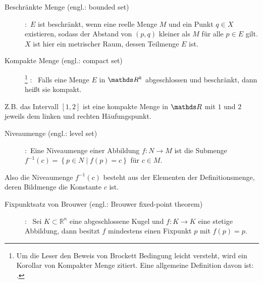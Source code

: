 \begin{Def}
	\begin{description}
		\item[Beschränkte Menge (engl.: bounded set)]
		\cite[S. 36]{rudin2009analysis}:~$E$ ist beschränkt, wenn eine reelle Menge $M$ und ein Punkt $q\in X$ existieren, sodass der Abstand von $(p,q)$ kleiner als $M$ für alle $p\in E$ gilt. $X$ ist hier ein metrischer Raum, dessen Teilmenge $E$ ist.
	\end{description}
\end{Def}
\begin{Def}
	\begin{description}
		\item[Kompakte Menge (engl.: compact set)]\footnote{Um die Leser den Beweis von Brockett Bedingung leicht versteht, wird ein Korollar von Kompakter Menge zitiert. Eine allgemeine Definition davon ist: .}
		\cite[S. 45]{rudin2009analysis}:~ Falls eine Menge $E$ in $\Reals^{k}$ abgeschlossen und beschränkt, dann heißt sie kompakt.
	\end{description}
\end{Def}
\vspace{-0.8em}
Z.B. das Intervall $\left [ 1,2 \right ]$ ist eine kompakte Menge in $\Reals$ mit $1$ und $2$ jeweils dem linken und rechten Häufungspunkt. %
\begin{Def}
	\begin{description}
		\item[Niveaumenge (engl.: level set)]
		\cite[S. 94]{tu2010introduction}:~Eine Niveaumenge einer Abbildung $f:N \to M$ ist die Submenge $f^{-1}\left ( c \right )= \left \{ p\in N \mid f\left ( p \right )= c\right \}$ für $c\in M$.
	\end{description}
\end{Def}
\vspace{-0.8em}
Also die Niveaumenge $f^{-1}\left ( c \right )$ besteht aus der Elementen der Definitionsmenge, deren Bildmenge die Konstante $c$ ist.
\begin{Def}
	\begin{description}
		\item[Fixpunktsatz von Brouwer (engl.: Brouwer fixed-point theorem)]
		\cite[S. 7]{hundfixpunktsatz}:~ Sei $K \subset \mathbb{R}^{n}$ eine abgeschlossene Kugel und $f:K\to K$ eine stetige Abbildung, dann besitzt $f$ mindestens einen Fixpunkt $p$ mit $f(p)=p$.
	\end{description}
\end{Def}
